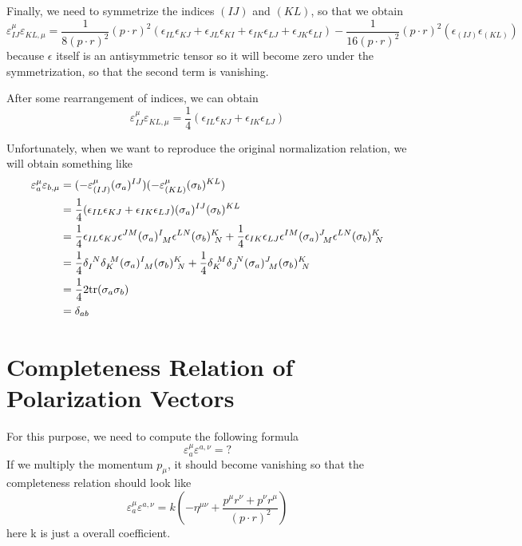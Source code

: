 \documentclass[12pt]{article}
\begin{document}
Finally, we need to symmetrize the indices $(IJ)$ and $(KL)$, so that we obtain
\begin{equation}
    \varepsilon^\mu_{IJ}\varepsilon^{}_{KL,\mu}=\frac{1}{8(p\cdot r)^2}(p\cdot r)^2(\epsilon_{IL}\epsilon_{KJ}+\epsilon_{JL}\epsilon_{KI}+\epsilon_{IK}\epsilon_{LJ}+\epsilon_{JK}\epsilon_{LI})-\frac{1}{16 (p\cdot r)^2}(p\cdot r)^2(\epsilon_{(IJ)}\epsilon_{(KL)})
\end{equation}
because $\epsilon$ itself is an antisymmetric tensor so it will become zero under the symmetrization, so that the second term is vanishing.

After some rearrangement of indices, we can obtain
\begin{equation}
    \varepsilon^\mu_{IJ}\varepsilon^{}_{KL,\mu}=\frac{1}{4}(\epsilon_{IL}\epsilon_{KJ}+\epsilon_{IK}\epsilon_{LJ})
\end{equation}

Unfortunately, when we want to reproduce the original normalization relation, we will obtain something like
\begin{align}
    \varepsilon_a^\mu\varepsilon_{b,\mu}&=(-\varepsilon^\mu_{(IJ)}(\sigma_a)^{IJ})(-\varepsilon^\mu_{(KL)}(\sigma_b)^{KL})\notag \\
    &= \frac{1}{4}(\epsilon_{IL}\epsilon_{KJ}+\epsilon_{IK}\epsilon_{LJ})(\sigma_a)^{IJ}(\sigma_b)^{KL}\notag \\
    &=\frac{1}{4}\epsilon_{IL}\epsilon_{KJ}\epsilon^{JM}(\sigma_a)^I_{\ M}\epsilon^{LN}(\sigma_b)^K_{\ N}+\frac{1}{4}\epsilon_{IK}\epsilon_{LJ}\epsilon^{IM}(\sigma_a)^J_{\ M}\epsilon^{LN}(\sigma_b)^K_{\ N}\notag \\
    &=\frac{1}{4}\delta_I^{\ N}\delta_K^{\ M}(\sigma_a)^I_{\ M}(\sigma_b)^K_{\ N}+\frac{1}{4}\delta_K^{\ M}\delta_J^{\ N}(\sigma_a)^J_{\ M}(\sigma_b)^K_{\ N}\notag \\
    &=\frac{1}{4}2\mathrm{tr}(\sigma_a\sigma_b)\notag \\
    &=\delta_{ab}
\end{align}

\section{Completeness Relation of Polarization Vectors}
For this purpose, we need to compute the following formula
\begin{equation}
    \varepsilon_a^\mu \varepsilon^{a,\nu}=?
\end{equation}
If we multiply the momentum $p_\mu$, it should become vanishing so that the completeness relation should look like 
\begin{equation}
    \varepsilon_a^\mu \varepsilon^{a,\nu}=k(-\eta^{\mu\nu}+\frac{p^\mu r^\nu+p^\nu r^\mu}{(p\cdot r)^2})
\end{equation}
here k is just a overall coefficient.
\end{document}
